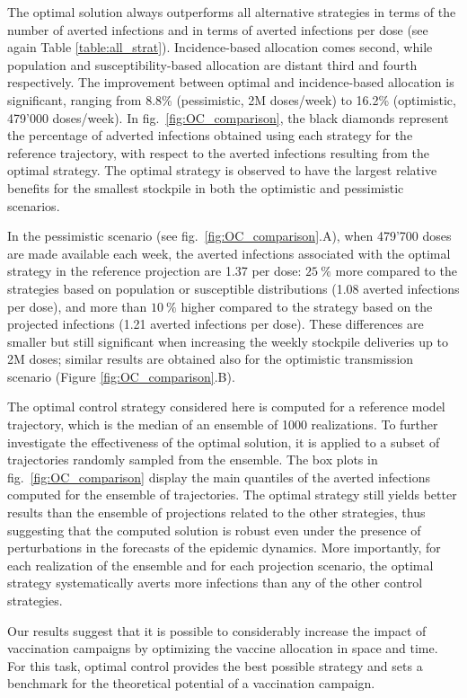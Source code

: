 The optimal solution always outperforms all alternative strategies in terms of the number of averted infections and in terms of averted infections per dose (see again Table \ref{table:all_strat}). Incidence-based allocation comes second, while population and susceptibility-based allocation are distant third and fourth respectively. The improvement between optimal and incidence-based allocation is significant, ranging from 8.8\% (pessimistic, 2M doses/week) to 16.2\% (optimistic, 479'000 doses/week). In fig.~\ref{fig:OC_comparison}, the black diamonds represent the percentage of adverted infections obtained using each strategy for the reference trajectory, with respect to the averted infections resulting from the optimal strategy. The optimal strategy is observed to have the largest relative benefits for the smallest stockpile in both the optimistic and pessimistic scenarios. 

In the pessimistic scenario (see fig.~\ref{fig:OC_comparison}.A), when 479'700 doses are made available each week, the averted infections associated with the optimal strategy in the reference projection are 1.37 per dose: $25~\%$ more compared to the strategies based on population or susceptible distributions (1.08 averted infections per dose), and more than $10~\%$ higher compared to the strategy based on the projected infections (1.21 averted infections per dose). These differences are smaller but still significant when increasing the weekly stockpile deliveries up to 2M doses; similar results are obtained also for the optimistic transmission scenario (Figure \ref{fig:OC_comparison}.B). 

The optimal control strategy considered here is computed for a reference model trajectory, which is the median of an ensemble of 1000 realizations. To further investigate the effectiveness of the optimal solution, it is applied to a subset of trajectories randomly sampled from the ensemble. The box plots in fig.~\ref{fig:OC_comparison} display the main quantiles of the averted infections computed for the ensemble of trajectories. The optimal strategy still yields better results than the ensemble of projections related to the other strategies, thus suggesting that the computed solution is robust even under the presence of perturbations in the forecasts of the epidemic dynamics. More importantly, for each realization of the ensemble and for each projection scenario, the optimal strategy systematically averts more infections than any of the other control strategies.

Our results suggest that it is possible to considerably increase the impact of vaccination campaigns by optimizing the vaccine allocation in space and time. For this task, optimal control provides the best possible strategy and sets a benchmark for the theoretical potential of a vaccination campaign.


